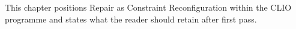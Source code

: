 This chapter positions Repair as Constraint Reconfiguration within the CLIO programme and states what the reader should retain after first pass.

